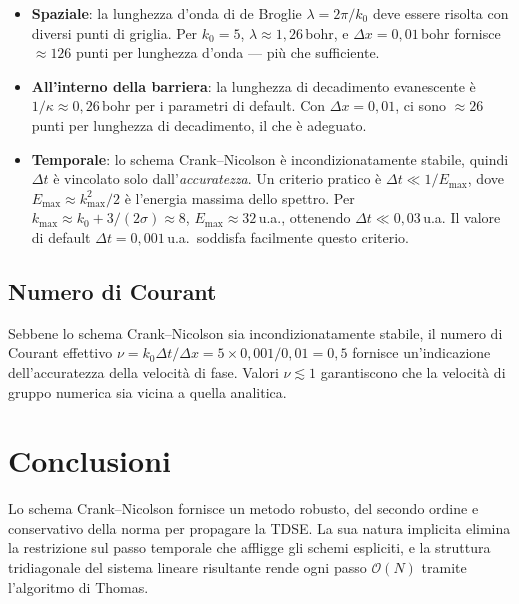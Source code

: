 \documentclass[12pt, a4paper]{article}
\newcommand{\dt}{\Delta t}
\newcommand{\dx}{\Delta x}
\newcommand{\CN}{Crank--Nicolson}
\begin{document}
\begin{itemize}
  \item \textbf{Spaziale}: la lunghezza d'onda di de Broglie $\lambda = 2\pi/k_0$
        deve essere risolta con diversi punti di griglia. Per $k_0 = 5$,
        $\lambda \approx 1{,}26$\,bohr, e $\dx = 0{,}01$\,bohr fornisce
        $\approx 126$ punti per lunghezza d'onda — più che sufficiente.

  \item \textbf{All'interno della barriera}: la lunghezza di decadimento
        evanescente è $1/\kappa \approx 0{,}26$\,bohr per i parametri di
        default. Con $\dx = 0{,}01$, ci sono $\approx 26$ punti per lunghezza
        di decadimento, il che è adeguato.

  \item \textbf{Temporale}: lo schema \CN{} è incondizionatamente stabile,
        quindi $\dt$ è vincolato solo dall'\emph{accuratezza}. Un criterio
        pratico è $\dt \ll 1/E_\text{max}$, dove
        $E_\text{max} \approx k_\text{max}^2/2$ è l'energia massima dello
        spettro. Per $k_\text{max} \approx k_0 + 3/(2\sigma)
        \approx 8$, $E_\text{max} \approx 32$\,u.a., ottenendo
        $\dt \ll 0{,}03$\,u.a. Il valore di default $\dt = 0{,}001$\,u.a.\ soddisfa
        facilmente questo criterio.
\end{itemize}

\subsection{Numero di Courant}

Sebbene lo schema \CN{} sia incondizionatamente stabile, il numero di
Courant effettivo $\nu = k_0\dt/\dx = 5 \times 0{,}001 / 0{,}01 = 0{,}5$
fornisce un'indicazione dell'accuratezza della velocità di fase. Valori
$\nu \lesssim 1$ garantiscono che la velocità di gruppo numerica sia vicina
a quella analitica.

\section{Conclusioni}

Lo schema \CN{} fornisce un metodo robusto, del secondo ordine e
conservativo della norma per propagare la TDSE. La sua natura implicita
elimina la restrizione sul passo temporale che affligge gli schemi espliciti,
e la struttura tridiagonale del sistema lineare risultante rende ogni
passo $\mathcal{O}(N)$ tramite l'algoritmo di Thomas.
\end{document}
